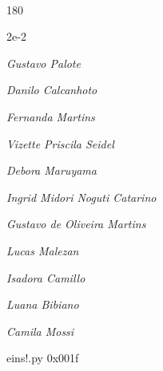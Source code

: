 \documentclass[12pt]{article}
\begin{document}

\pagebreak			

	\ 
	\vfill
	\begin{turn}{180}	
		\begin{minipage}{\textwidth}
		  	\ttfamily %
			\centering
			{\Huge 2e-2}
		  
			\hfill
		  
			

\textit{\small Gustavo Palote}

\textit{\small Danilo Calcanhoto}

\textit{\small Fernanda Martins}

\textit{\small Vizette Priscila Seidel}

\textit{\small Debora Maruyama}

\textit{\small Ingrid Midori Noguti Catarino}

\textit{\small Gustavo de Oliveira Martins}

\textit{\small Lucas Malezan}

\textit{\small Isadora Camillo}

\textit{\small Luana Bibiano}

\textit{\small Camila Mossi}

\bigskip

eins!.py
0x001f


		\end{minipage}	
	\end{turn}
	\vfill
	\

\pagebreak
\end{document}

